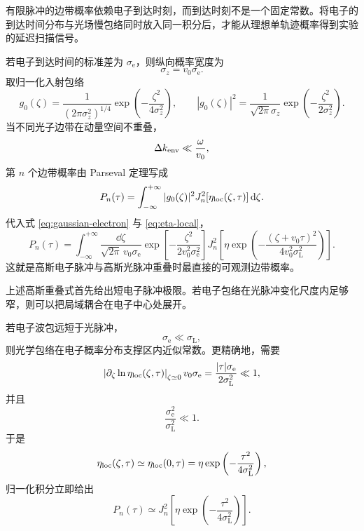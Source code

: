 有限脉冲的边带概率依赖电子到达时刻，而到达时刻不是一个固定常数。将电子的到达时间分布与光场慢包络同时放入同一积分后，才能从理想单轨迹概率得到实验的延迟扫描信号。

若电子到达时间的标准差为 $\sigma_{\mathrm e}$，则纵向概率宽度为
\[
\sigma_z=v_0\sigma_{\mathrm e}.
\]
取归一化入射包络
\begin{equation}
g_0(\zeta)
=
\frac{1}{(2\pi\sigma_z^2)^{1/4}}
\exp\left(-\frac{\zeta^2}{4\sigma_z^2}\right),
\qquad
|g_0(\zeta)|^2
=
\frac{1}{\sqrt{2\pi}\sigma_z}
\exp\left(-\frac{\zeta^2}{2\sigma_z^2}\right).
\label{eq:gaussian-electron}
\end{equation}
当不同光子边带在动量空间不重叠，
\begin{equation}
{
\Delta k_{\rm env}\ll\frac{\omega}{v_0},}
\label{eq:special-nonoverlap}
\end{equation}
第 $n$ 个边带概率由 Parseval 定理写成
\begin{equation}
P_n(\tau)
=
\int_{-\infty}^{+\infty}
|g_0(\zeta)|^2
J_n^2\!\left[\eta_{\rm loc}(\zeta,\tau)\right]\mathrm{d}\zeta.
\label{eq:Pn-general-gaussian}
\end{equation}
代入式 \cref{eq:gaussian-electron} 与 \cref{eq:eta-local}，
\begin{equation}
{
P_n(\tau)
=
\int_{-\infty}^{+\infty}
\frac{\dd\zeta}{\sqrt{2\pi}\,v_0\sigma_{\mathrm e}}
\exp\left[-\frac{\zeta^2}{2v_0^2\sigma_{\mathrm e}^2}\right]
J_n^2\!\left[
\eta
\exp\left(
-\frac{(\zeta+v_0\tau)^2}
{4v_0^2\sigma_{\mathrm L}^2}
\right)
\right].}
\label{eq:Pn-gaussian}
\end{equation}
这就是高斯电子脉冲与高斯光脉冲重叠时最直接的可观测边带概率。

上述高斯重叠式首先给出短电子脉冲极限。若电子包络在光脉冲变化尺度内足够窄，则可以把局域耦合在电子中心处展开。

若电子波包远短于光脉冲，
\begin{equation}
{\sigma_{\mathrm e}\ll\sigma_{\mathrm L},}
\label{eq:short-electron}
\end{equation}
则光学包络在电子概率分布支撑区内近似常数。更精确地，需要
\begin{equation}
\left|
\partial_\zeta\ln \eta_{\rm loc}(\zeta,\tau)
\right|_{\zeta\simeq0}
v_0\sigma_{\mathrm e}
=
\frac{|\tau|\sigma_{\mathrm e}}{2\sigma_{\mathrm L}^2}
\ll1,
\end{equation}
并且
\[
\frac{\sigma_{\mathrm e}^2}{\sigma_{\mathrm L}^2}\ll1.
\]
于是
\[
\eta_{\rm loc}(\zeta,\tau)\simeq \eta_{\rm loc}(0,\tau)
=
\eta\exp\left(-\frac{\tau^2}{4\sigma_{\mathrm L}^2}\right),
\]
归一化积分立即给出
\begin{equation}
{
P_n(\tau)
\simeq
J_n^2\!\left[
\eta
\exp\left(-\frac{\tau^2}{4\sigma_{\mathrm L}^2}\right)
\right].}
\label{eq:Pn-short-electron}
\end{equation}

